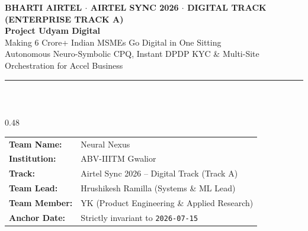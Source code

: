 \documentclass[aspectratio=169,10pt]{beamer}
\begin{document}
\begin{frame}[plain]
  \vspace{0.25cm}
  \begin{center}
    {\fontsize{7pt}{8.5pt}\selectfont\textbf{\textcolor{airtelred}{BHARTI AIRTEL $\cdot$ AIRTEL SYNC 2026 $\cdot$ DIGITAL TRACK (ENTERPRISE TRACK A)}}} \\[0.12cm]
    {\fontsize{16pt}{19pt}\selectfont\textbf{Project Udyam Digital}} \\[0.06cm]
    {\fontsize{9.5pt}{11.5pt}\selectfont\textcolor{mutedgray}{Making 6 Crore+ Indian MSMEs Go Digital in One Sitting}} \\[0.03cm]
    {\fontsize{6.8pt}{8.2pt}\selectfont\textcolor{mutedgray}{Autonomous Neuro-Symbolic CPQ, Instant DPDP KYC \& Multi-Site Orchestration for Accel Business}} \\[0.15cm]
    \textcolor{bordergray}{\rule{0.85\paperwidth}{0.4pt}} \\[0.12cm]
  \end{center}

  \begin{columns}[T]
    \begin{column}{0.48\textwidth}
      \begin{tcolorbox}[academicbox, title={\fontsize{7pt}{8.5pt}\selectfont\textbf{\textcolor{charcoal}{Team \& Institutional Registration}}}, coltitle=charcoal]
        {\fontsize{5.8pt}{7.2pt}\selectfont
        \begin{tabularx}{\linewidth}{p{1.8cm}X}
          \textbf{Team Name:} & Neural Nexus \\
          \textbf{Institution:} & ABV-IIITM Gwalior \\
          \textbf{Track:} & Airtel Sync 2026 -- Digital Track (Track A) \\
          \textbf{Team Lead:} & Hrushikesh Ramilla (Systems \& ML Lead) \\
          \textbf{Team Member:} & YK (Product Engineering \& Applied Research) \\
          \textbf{Anchor Date:} & Strictly invariant to \texttt{2026-07-15} \\
        \end{tabularx}
        }
      \end{tcolorbox}
    \end{column}


\end{columns}
\end{frame}
\end{document}
